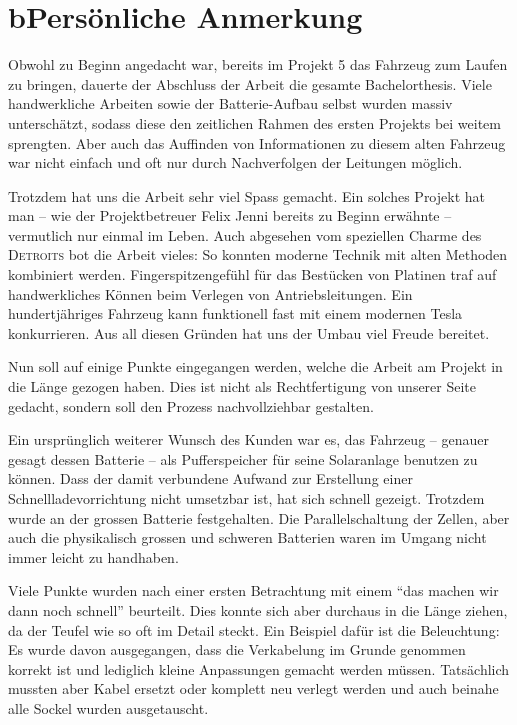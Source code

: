 \chapter*{b\quad Persönliche Anmerkung}
Obwohl zu Beginn angedacht war, bereits im Projekt 5 das Fahrzeug zum Laufen zu bringen, dauerte der Abschluss der Arbeit die gesamte Bachelorthesis. Viele handwerkliche Arbeiten sowie der Batterie-Aufbau selbst wurden massiv unterschätzt, sodass diese den zeitlichen Rahmen des ersten Projekts bei weitem sprengten. Aber auch das Auffinden von Informationen zu diesem alten Fahrzeug war nicht einfach und oft nur durch Nachverfolgen der Leitungen möglich.

Trotzdem hat uns die Arbeit sehr viel Spass gemacht. Ein solches Projekt hat man -- wie der Projektbetreuer Felix Jenni bereits zu Beginn erwähnte -- vermutlich nur einmal im Leben. Auch abgesehen vom speziellen Charme des \textsc{Detroits} bot die Arbeit vieles: So konnten moderne Technik mit alten Methoden kombiniert werden. Fingerspitzengefühl für das Bestücken von Platinen traf auf handwerkliches Können beim Verlegen von Antriebsleitungen. Ein hundertjähriges Fahrzeug kann funktionell fast mit einem modernen Tesla konkurrieren. Aus all diesen Gründen hat uns der Umbau viel Freude bereitet.

Nun soll auf einige Punkte eingegangen werden, welche die Arbeit am Projekt in die Länge gezogen haben. Dies ist nicht als Rechtfertigung von unserer Seite gedacht, sondern soll den Prozess nachvollziehbar gestalten.

Ein ursprünglich weiterer Wunsch des Kunden war es, das Fahrzeug -- genauer gesagt dessen Batterie -- als Pufferspeicher für seine Solaranlage benutzen zu können. Dass der damit verbundene Aufwand zur Erstellung einer Schnellladevorrichtung nicht umsetzbar ist, hat sich schnell gezeigt. Trotzdem wurde an der grossen Batterie festgehalten. Die Parallelschaltung der Zellen, aber auch die physikalisch grossen und schweren Batterien waren im Umgang nicht immer leicht zu handhaben.

Viele Punkte wurden nach einer ersten Betrachtung mit einem "`das machen wir dann noch schnell"' beurteilt. Dies konnte sich aber durchaus in die Länge ziehen, da der Teufel wie so oft im Detail steckt. Ein Beispiel dafür ist die Beleuchtung: Es wurde davon ausgegangen, dass die Verkabelung im Grunde genommen korrekt ist und lediglich kleine Anpassungen gemacht werden müssen. Tatsächlich mussten aber Kabel ersetzt oder komplett neu verlegt werden und auch beinahe alle Sockel wurden ausgetauscht.

